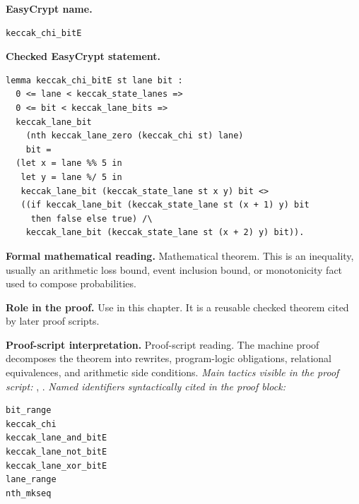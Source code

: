 \begin{formaltheorem}
\noindent\textbf{EasyCrypt name.}
\begin{lstlisting}[language=EasyCrypt,basicstyle=\ttfamily\scriptsize]
keccak_chi_bitE
\end{lstlisting}
\noindent\textbf{Checked EasyCrypt statement.}
\begin{lstlisting}[language=EasyCrypt,basicstyle=\ttfamily\scriptsize]
lemma keccak_chi_bitE st lane bit :
  0 <= lane < keccak_state_lanes =>
  0 <= bit < keccak_lane_bits =>
  keccak_lane_bit
    (nth keccak_lane_zero (keccak_chi st) lane)
    bit =
  (let x = lane %% 5 in
   let y = lane %/ 5 in
   keccak_lane_bit (keccak_state_lane st x y) bit <>
   ((if keccak_lane_bit (keccak_state_lane st (x + 1) y) bit
     then false else true) /\
    keccak_lane_bit (keccak_state_lane st (x + 2) y) bit)).
\end{lstlisting}
\noindent\textbf{Formal mathematical reading.}
Mathematical theorem. This is an inequality, usually an arithmetic loss bound, event inclusion bound, or monotonicity fact used to compose probabilities.

\noindent\textbf{Role in the proof.}
Use in this chapter. It is a reusable checked theorem cited by later proof scripts.

\noindent\textbf{Proof-script interpretation.}
Proof-script reading. The machine proof decomposes the theorem into rewrites, program-logic obligations, relational equivalences, and arithmetic side conditions.
\emph{Main tactics visible in the proof script:} \ec{rewrite}, \ec{smt}.
\emph{Named identifiers syntactically cited in the proof block:}
\begin{lstlisting}[language=EasyCrypt,basicstyle=\ttfamily\scriptsize]
bit_range
keccak_chi
keccak_lane_and_bitE
keccak_lane_not_bitE
keccak_lane_xor_bitE
lane_range
nth_mkseq
\end{lstlisting}

\end{formaltheorem}

